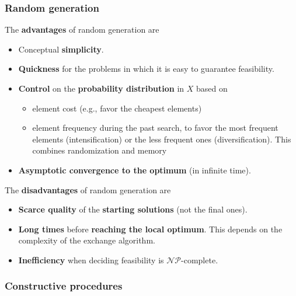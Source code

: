 \newpage

\subsubsection{Random generation}

The \textbf{advantages} of random generation are
\begin{itemize}
	\item Conceptual \textbf{simplicity}.\\
	
	\item \textbf{Quickness} for the problems in which it is easy to guarantee feasibility.\\
	
	\item \textbf{Control} on the \textbf{probability distribution} in $X$ based on
	\begin{itemize}
		\item element cost (e.g., favor the cheapest elements)
		
		\item element frequency during the past search, to favor the most frequent elements (intensification) or the less frequent ones (diversification). This combines randomization and memory
	\end{itemize}
	\nn
	
	\item \textbf{Asymptotic convergence to the optimum} (in infinite time).\\
\end{itemize}


The \textbf{disadvantages} of random generation are
\begin{itemize}
	\item \textbf{Scarce quality} of the \textbf{starting solutions} (not the final ones).\\
	
	\item \textbf{Long times} before \textbf{reaching the local optimum}. This depends on the complexity of the exchange algorithm.\\
	
	\item \textbf{Inefficiency} when deciding feasibility is $\mathcal{NP}$-complete.\\
\end{itemize}

\newpage

\subsubsection{Constructive procedures}


